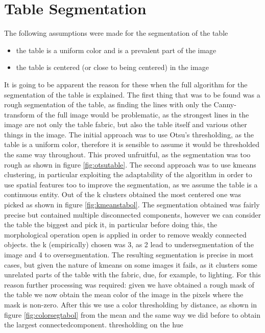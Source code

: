 \section{Table Segmentation}

The following assumptions were made for the segmentation of the table
\begin{itemize}
    \item the table is a uniform color and is a prevalent part of the image
    \item the table is centered (or close to being centered) in the image
\end{itemize}

It is going to be apparent the reason for these when the full algorithm for
the segmentation of the table is explained.
The first thing that was to be found was a rough segmentation of the table,
as finding the lines with only the Canny-transform of the full image would 
be problematic, as the strongest lines in the image are not only the table
fabric, but also the table itself and various other things in the image.
The initial approach was to use Otsu's thresholding, as the table is a uniform
color, therefore it is sensible to assume it would be thresholded the same
way throughout. This proved unfruitful, as the segmentation was too rough as shown in figure \ref{fig:otsutable}.
The second approach was to use kmeans clustering, in particular exploiting the
adaptability of the algorithm in order to use spatial features too to improve
the segmentation, as we assume the table is a continuous entity. Out of the k clusters obtained the most centered one was picked as shown in figure \ref{fig:kmeanstabol}.
The segmentation obtained was fairly precise but contained multiple disconnected
components, however we can consider the table the biggest and pick it, in particular
before doing this, the morphological operation open is applied in order to remove weakly connected objects.
the k (empirically) chosen was 3, as 2 lead to undersegmentation of the image and 4 to oversegmentation.
The resulting segmentation is precise in most cases, but given the nature of kmeans on some
images it fails, as it clusters some unrelated parts of the table with the fabric, due,
for example, to lighting.
For this reason further processing was required: given we have obtained a rough mask of
the table we now obtain the mean color of the image in the pixels where the mask is non-zero.
After this we use a color thresholding by distance, as shown in figure \ref{fig:colorsegtabol} from the mean and the same way we 
did before to obtain the largest connectedcomponent. thresholding on the hue
